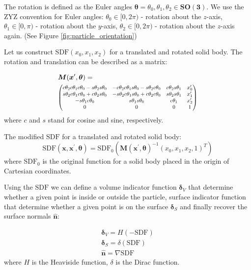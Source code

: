 \documentclass[10pt, a4paper]{article}
\newcommand\scalemath[2]{\scalebox{#1}{\mbox{\ensuremath{\displaystyle #2}}}}
\begin{document}
\begin{multicols}{2}
The rotation is defined as the Euler angles $\bm{\theta} = \theta_0, \theta_1, \theta_2 \in \bm{SO(3)}$.
We use the ZYZ convention for Euler angles:
$\theta_0 \in [0, 2\pi)$ - rotation about the $z$-axis,
$\theta_1 \in [0, \pi)$ - rotation about the $y$-axis,
$\theta_2 \in [0, 2\pi)$ - rotation about the $z$-axis again. 
(See Figure \ref{fig:particle_orientation})


Let us construct $\textrm{SDF}(x_0, x_1, x_2)$ for a translated and rotated solid body.
The rotation and translation can be described as a matrix:

\begin{equation}
    \begin{aligned}
    &\bm{M}(\bm{x}^\prime, \bm{\theta}) =
    \\
    &\scalemath{0.8}{
        \begin{pmatrix}
            c\theta_2 c\theta_1 c\theta_0 - s\theta_2 s\theta_0 & -c\theta_2 c\theta_1 s\theta_0 - s\theta_2 c\theta_0 & c\theta_2 s\theta_1 & x^{\prime}_0 \\
            s\theta_2 c\theta_1 c\theta_0 + c\theta_2 s\theta_0 & -s\theta_2 c\theta_1 s\theta_0 + c\theta_2 c\theta_0 & s\theta_2 s\theta_1 & x^{\prime}_1 \\
            -s\theta_1 c\theta_0 & s\theta_1 s\theta_0 & c\theta_1 & x^{\prime}_2 \\
            0 & 0 & 0 & 1
        \end{pmatrix}
    }
    \end{aligned}
\end{equation}
where $c$ and $s$ stand for cosine and sine, respectively. 
 
The modified $\textrm{SDF}$ for a translated and rotated solid body:
\begin{equation}
    \textrm{SDF}(\bm{x}, \bm{x}^{\prime}, \bm{\theta}) = \textrm{SDF}_{0}(\bm{M}(\bm{x}^\prime, \bm{\theta})^{-1} (x_0, x_1, x_2, 1)^{T})
\end{equation}
where $\textrm{SDF}_{0}$ is the original function for a solid body placed in the origin of Cartesian coordinates.

Using the $\textrm{SDF}$ we can define a volume indicator function $\bm{\delta}_V$ that determine whether a given point is inside or outside the particle, surface indicator function that determine whether a given point is on the surface $\bm{\delta}_S$ and finally recover the surface normals $\hat{\bm{n}}$:

\begin{gather}
    \bm{\delta}_V = H(-\textrm{SDF})\\
    \bm{\delta}_S = \delta(\textrm{SDF})\\
    \hat{\bm{n}} = \nabla \textrm{SDF}
\end{gather}
where $H$ is the Heaviside function, $\delta$ is the Dirac function.


\end{multicols}
\end{document}
